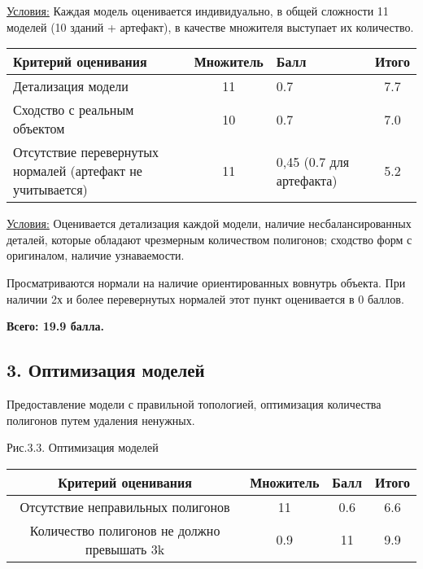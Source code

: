 \underline{Условия:} Каждая модель оценивается индивидуально, в общей сложности 11 моделей (10 зданий + артефакт), в качестве множителя выступает их количество.

\begin{table}[H]
    \begin{center}
        \begin{tabular}{|p{8cm}|c|p{2cm}|c|}
            \hline
            Критерий оценивания	& Множитель	& Балл	& Итого \\
            \hline
            Детализация модели &	11 &	0.7 &	7.7 \\
            \hline
            Сходство с реальным объектом	& 10 &	0.7 &	7.0\\
            \hline 
            Отсутствие перевернутых нормалей (артефакт не учитывается) &	11	& 0,45 
            (0.7 для артефакта)
             &	5.2 \\
            \hline
        \end{tabular} 
    \end {center} 
\end{table}         

\underline{Условия:} Оценивается детализация каждой модели, наличие несбалансированных деталей, которые обладают чрезмерным количеством полигонов; сходство форм с оригиналом, наличие узнаваемости. 

Просматриваются нормали на наличие ориентированных вовнутрь объекта. При наличии 2х и более перевернутых нормалей этот пункт оценивается в 0 баллов.

\textbf{Всего: 19.9 балла.}

\subsection*{3. Оптимизация моделей}

Предоставление модели с правильной топологией, оптимизация количества полигонов путем удаления ненужных.



\begin{center}
    Рис.3.3. Оптимизация моделей
\end{center}

\begin{table}[H]
    \begin{center}
        \begin{tabular}{|c|c|c|c|}
            \hline
            Критерий оценивания &	Множитель & Балл & Итого \\
            \hline
            Отсутствие неправильных полигонов & 11 & 0.6 & 6.6 \\
            \hline
            Количество полигонов не должно превышать 3k & 0.9 & 11 & 9.9\\
            \hline
        \end{tabular} 
    \end {center} 
\end{table}         
    

